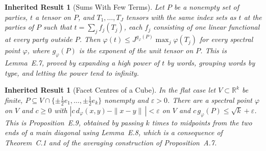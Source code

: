 \documentclass[11pt,letterpaper]{report}
\theoremstyle{plain}
\newtheorem{inherited}[theorem]{Inherited Result}
\theoremstyle{definition}
\theoremstyle{remark}
\begin{document}
\begin{inherited}[Sums With Few Terms]
Let $P$ be a nonempty set of parties, $t$ a tensor on $P$, and $T_1,\ldots,T_J$ tensors with the same index sets as $t$ at the parties of $P$ such that $t=\sum_jf_j(T_j)$, each $f_j$ consisting of one linear functional at every party outside $P$. Then $\varphi(t)\le J^{g_\varphi(P)}\max_j\varphi(T_j)$ for every spectral point $\varphi$, where $g_\varphi(P)$ is the exponent of the unit tensor on $P$. This is Lemma~E.7, proved by expanding a high power of $t$ by words, grouping words by type, and letting the power tend to infinity.
\end{inherited}

\begin{inherited}[Facet Centres of a Cube]
In the flat case let $V\subset\mathbb R^k$ be finite, $P\subseteq V\cap\{\pm\tfrac12e_1,\ldots,\pm\tfrac12e_k\}$ nonempty and $\varepsilon>0$. There are a spectral point $\varphi$ on $V$ and $c\ge0$ with $|c\,d_\varphi(x,y)-\|x-y\|\,|<\varepsilon$ on $V$ and $c\,g_\varphi(P)\le\sqrt k+\varepsilon$. This is Proposition~E.9, obtained by passing $k$ times to midpoints from the two ends of a main diagonal using Lemma~E.8, which is a consequence of Theorem~C.1 and of the averaging construction of Proposition~A.7.
\end{inherited}
\end{document}
